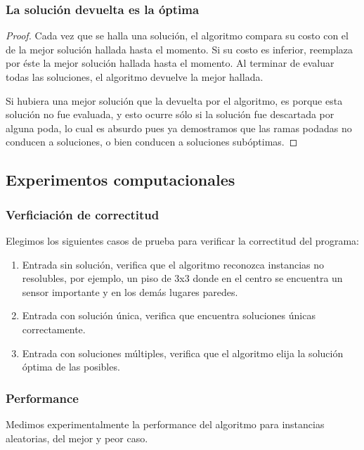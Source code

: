\documentclass[a4paper, 10pt, twoside]{article}
\begin{document}
\subsubsection{La solución devuelta es la óptima}

\begin{proof}
    Cada vez que se halla una solución, el algoritmo compara su costo con el de la mejor solución hallada hasta el momento. Si su costo es inferior, reemplaza por éste la mejor solución hallada hasta el momento. Al terminar de evaluar todas las soluciones, el algoritmo devuelve la mejor hallada.

    Si hubiera una mejor solución que la devuelta por el algoritmo, es porque esta solución no fue evaluada, y esto ocurre sólo si la solución fue descartada por alguna poda, lo cual es absurdo pues ya demostramos que las ramas podadas no conducen a soluciones, o bien conducen a soluciones subóptimas.
\end{proof}


\subsection{Experimentos computacionales}

\subsubsection{Verficiación de correctitud}

Elegimos los siguientes casos de prueba para verificar la correctitud del programa:

\begin{enumerate}
\item Entrada sin solución, verifica que el algoritmo reconozca instancias no resolubles, por ejemplo, un piso de 3x3 donde en el centro se encuentra un sensor importante y en los demás lugares paredes.
\item Entrada con solución única, verifica que encuentra soluciones únicas correctamente.
\item Entrada con soluciones múltiples, verifica que el algoritmo elija la solución óptima de las posibles.
\end{enumerate}

\subsubsection{Performance}

Medimos experimentalmente la performance del algoritmo para instancias aleatorias, del mejor y peor caso.
\end{document}
